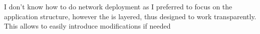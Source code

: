 \begin{NAQ}

   {I don't know how to do network deployment as I preferred to focus on
    the application structure, however the  is layered, thus
    designed to work transparently. This allows to easily introduce
    modifications if needed}

\end{NAQ}
